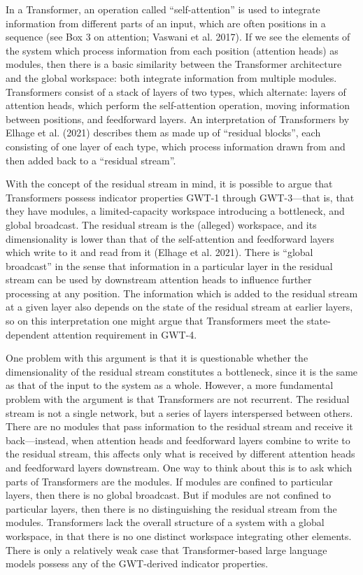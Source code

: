 \documentclass[12pt]{article}
\begin{document}
In a Transformer, an operation called ``self-attention'' is used to integrate information from different parts of an input, which are often positions in a sequence (see Box 3 on attention; Vaswani et al. 2017). If we see the elements of the system which process information from each position (attention heads) as modules, then there is a basic similarity between the Transformer architecture and the global workspace: both integrate information from multiple modules. Transformers consist of a stack of layers of two types, which alternate: layers of attention heads, which perform the self-attention operation, moving information between positions, and feedforward layers. An interpretation of Transformers by Elhage et al. (2021) describes them as made up of ``residual blocks'', each consisting of one layer of each type, which process information drawn from and then added back to a ``residual stream''.


\FloatBarrier

With the concept of the residual stream in mind, it is possible to argue that Transformers possess indicator properties GWT-1 through GWT-3—that is, that they have modules, a limited-capacity workspace introducing a bottleneck, and global broadcast. The residual stream is the (alleged) workspace, and its dimensionality is lower than that of the self-attention and feedforward layers which write to it and read from it (Elhage et al. 2021). There is ``global broadcast'' in the sense that information in a particular layer in the residual stream can be used by downstream attention heads to influence further processing at any position. The information which is added to the residual stream at a given layer also depends on the state of the residual stream at earlier layers, so on this interpretation one might argue that Transformers meet the state-dependent attention requirement in GWT-4.

One problem with this argument is that it is questionable whether the dimensionality of the residual stream constitutes a bottleneck, since it is the same as that of the input to the system as a whole. However, a more fundamental problem with the argument is that Transformers are not recurrent. The residual stream is not a single network, but a series of layers interspersed between others. There are no modules that pass information to the residual stream and receive it back—instead, when attention heads and feedforward layers combine to write to the residual stream, this affects only what is received by different attention heads and feedforward layers downstream. One way to think about this is to ask which parts of Transformers are the modules. If modules are confined to particular layers, then there is no global broadcast. But if modules are not confined to particular layers, then there is no distinguishing the residual stream from the modules. Transformers lack the overall structure of a system with a global workspace, in that there is no one distinct workspace integrating other elements. There is only a relatively weak case that Transformer-based large language models possess any of the GWT-derived indicator properties.
\end{document}
